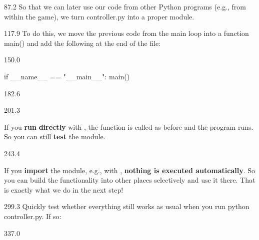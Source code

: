 \documentclass{aslab}
\begin{document}
\begin{region}[pitch=13.1]{87.2}
So that we can later use our code from other Python programs (e.g., from
within the game), we turn controller.py into a proper module.
\end{region}

\begin{region}[pitch=13.2]{117.9}
To do this, we move the previous code from the main loop into a function
main() and add the following at the end of the file:
\end{region}

\begin{region}[pitch=13.2]{150.0}
\begin{codeblock}
if __name__ == "__main__":
    main()
\end{codeblock}
\end{region}

\begin{region}{182.6}
\end{region}

\begin{region}[pitch=14.4]{201.3}
\begin{dashlist}
\item If you \textbf{run}  \textbf{directly} with
  , the  function is called as
  before and the program runs. So you can still \textbf{test} the module.
\end{dashlist}
\end{region}

\begin{region}[pitch=14.3]{243.4}
\begin{dashlist}
\item If you \textbf{import} the module, e.g., with ,
  \textbf{nothing is executed automatically}. So you can build the
  functionality into other places selectively and use it there. That is
  exactly what we do in the next step!
\end{dashlist}
\end{region}

\begin{region}[pitch=18.8]{299.3}
Quickly test whether everything still works as usual when you run python
controller.py. If so:
\end{region}

\begin{region}[pitch=13.2]{337.0}
\\
\end{region}
\end{document}

